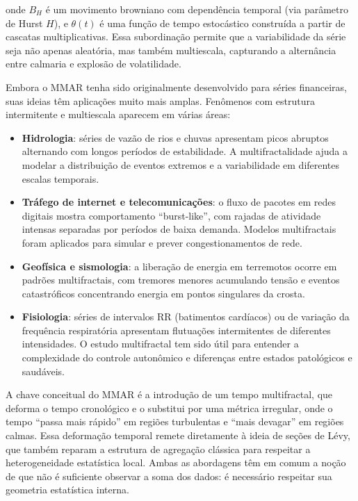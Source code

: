 \documentclass[
  letterpaper,
  DIV=11,
  numbers=noendperiod]{scrartcl}
\providecommand{\tightlist}{%
  \setlength{\itemsep}{0pt}\setlength{\parskip}{0pt}}\usepackage{longtable,booktabs,array}
\begin{document}
onde \(B_H\) é um movimento browniano com dependência temporal (via
parâmetro de Hurst \(H\)), e \(\theta(t)\) é uma função de tempo
estocástico construída a partir de cascatas multiplicativas. Essa
subordinação permite que a variabilidade da série seja não apenas
aleatória, mas também multiescala, capturando a alternância entre
calmaria e explosão de volatilidade.

Embora o MMAR tenha sido originalmente desenvolvido para séries
financeiras, suas ideias têm aplicações muito mais amplas. Fenômenos com
estrutura intermitente e multiescala aparecem em várias áreas:

\begin{itemize}
\tightlist
\item
  \textbf{Hidrologia}: séries de vazão de rios e chuvas apresentam picos
  abruptos alternando com longos períodos de estabilidade. A
  multifractalidade ajuda a modelar a distribuição de eventos extremos e
  a variabilidade em diferentes escalas temporais.
\item
  \textbf{Tráfego de internet e telecomunicações}: o fluxo de pacotes em
  redes digitais mostra comportamento ``burst-like'', com rajadas de
  atividade intensas separadas por períodos de baixa demanda. Modelos
  multifractais foram aplicados para simular e prever congestionamentos
  de rede.
\item
  \textbf{Geofísica e sismologia}: a liberação de energia em terremotos
  ocorre em padrões multifractais, com tremores menores acumulando
  tensão e eventos catastróficos concentrando energia em pontos
  singulares da crosta.
\item
  \textbf{Fisiologia}: séries de intervalos RR (batimentos cardíacos) ou
  de variação da frequência respiratória apresentam flutuações
  intermitentes de diferentes intensidades. O estudo multifractal tem
  sido útil para entender a complexidade do controle autonômico e
  diferenças entre estados patológicos e saudáveis.
\end{itemize}

A chave conceitual do MMAR é a introdução de um tempo multifractal, que
deforma o tempo cronológico e o substitui por uma métrica irregular,
onde o tempo ``passa mais rápido'' em regiões turbulentas e ``mais
devagar'' em regiões calmas. Essa deformação temporal remete diretamente
à ideia de seções de Lévy, que também reparam a estrutura de agregação
clássica para respeitar a heterogeneidade estatística local. Ambas as
abordagens têm em comum a noção de que não é suficiente observar a soma
dos dados: é necessário respeitar sua geometria estatística interna.
\end{document}
